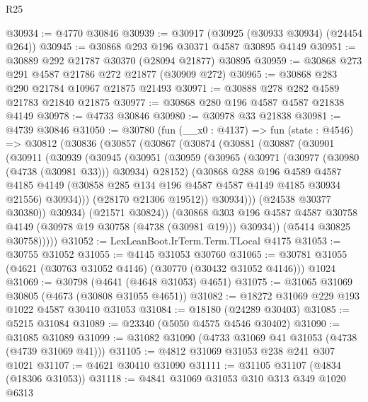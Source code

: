 \begin{lexlean}{R25}
\begin{coremodule}
@30934 := @4770 @30846
@30939 := @30917 (@30925 (@30933 @30934) (@24454 @264))
@30945 := @30868 @293 @196 @30371 @4587 @30895 @4149
@30951 := @30889 @292 @21787 @30370 (@28094 @21877) @30895
@30959 := @30868 @273 @291 @4587 @21786 @272 @21877 (@30909 @272)
@30965 := @30868 @283 @290 @21784 @10967 @21875 @21493
@30971 := @30888 @278 @282 @4589 @21783 @21840 @21875
@30977 := @30868 @280 @196 @4587 @4587 @21838 @4149
@30978 := @4733 @30846
@30980 := @30978 @33 @21838
@30981 := @4739 @30846
@31050 := @30780
    (fun (__x0 : @4137) =>
    fun (state : @4546) =>
    @30812
      (@30836
        (@30857
          (@30867
            (@30874
              (@30881
                (@30887
                  (@30901
                    (@30911
                      (@30939
                        (@30945
                          (@30951
                            (@30959
                              (@30965
                                (@30971 (@30977 (@30980 (@4738 (@30981 @33))) @30934) @28152)
                                (@30868
                                  @288
                                  @196
                                  @4589
                                  @4587
                                  @4185
                                  @4149
                                  (@30858 @285 @134 @196 @4587 @4587 @4149 @4185 @30934 @21556)
                                  @30934)))
                            (@28170 @21306 @19512))
                          @30934)))
                    (@24538 @30377 @30380))
                  @30934)
                (@21571 @30824))
              (@30868
                @303
                @196
                @4587
                @4587
                @30758
                @4149
                (@30978 @19 @30758 (@4738 (@30981 @19)))
                @30934))
            (@5414 @30825 @30758)))))
@31052 := LexLeanBoot.IrTerm.Term.TLocal @4175
@31053 := @30755 @31052
@31055 := @4145 @31053 @30760
@31065 := @30781 @31055 (@4621 (@30763 @31052 @4146) (@30770 (@30432 @31052 @4146))) @1024
@31069 := @30798 (@4641 (@4648 @31053) @4651)
@31075 := @31065 @31069 @30805 (@4673 (@30808 @31055 @4651))
@31082 := @18272 @31069 @229 @193 @1022 @4587 @30410 @31053
@31084 := @18180 (@24289 @30403)
@31085 := @5215 @31084
@31089 := @23340 (@5050 @4575 @4546 @30402)
@31090 := @31085 @31089
@31099 := @31082 @31090 (@4733 @31069 @41 @31053 (@4738 (@4739 @31069 @41)))
@31105 := @4812 @31069 @31053 @238 @241 @307 @1021
@31107 := @4621 @30410 @31090
@31111 := @31105 @31107 (@4834 (@18306 @31053))
@31118 := @4841 @31069 @31053 @310 @313 @349 @1020 @6313

\end{coremodule}
\end{lexlean}
